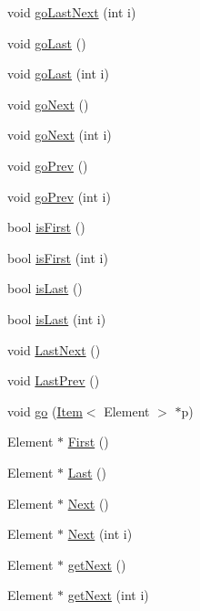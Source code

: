 \begin{CompactItemize}
void \hyperlink{classCollection_c8d2b742e6ccaf94d0e2511840a1783c}{goLastNext} (int i)
\item 
void \hyperlink{classCollection_24f595ff9a3daddd71e9625e12086b8d}{goLast} ()
\item 
void \hyperlink{classCollection_6729c15aabfe51403936a00551bcbaf7}{goLast} (int i)
\item 
void \hyperlink{classCollection_71ab918a6e6938f9e8bf1ce9ac36c25a}{goNext} ()
\item 
void \hyperlink{classCollection_8fe6a6dbc35949197de73013bb67fa07}{goNext} (int i)
\item 
void \hyperlink{classCollection_ba0170475fe3ff507bbcd8dc48a8f658}{goPrev} ()
\item 
void \hyperlink{classCollection_c3d18037a745f47a28b2ea652fdc564f}{goPrev} (int i)
\item 
bool \hyperlink{classCollection_3c644d87c5fe1109b3110c9bce5f55be}{isFirst} ()
\item 
bool \hyperlink{classCollection_2b74d7145a6497de50e7577a9e9bd8a0}{isFirst} (int i)
\item 
bool \hyperlink{classCollection_d78260d61be71fe6a0f8ccc949e64c97}{isLast} ()
\item 
bool \hyperlink{classCollection_d38ade90824908e6ad66ed29e48a617d}{isLast} (int i)
\item 
void \hyperlink{classCollection_8df9a591b311c789a49b9e7ebc8982b5}{LastNext} ()
\item 
void \hyperlink{classCollection_c72a422277e0f0b0964de5bf098ccfcb}{LastPrev} ()
\item 
void \hyperlink{classCollection_9e206e3c49e72d153b52eaa808d6f5c0}{go} (\hyperlink{structItem}{Item}$<$ Element $>$ $\ast$p)
\item 
Element $\ast$ \hyperlink{classCollection_40aead667bc00ad6a89d58c76add2f1f}{First} ()
\item 
Element $\ast$ \hyperlink{classCollection_4db73392b0ef7120c311226e3061eeb5}{Last} ()
\item 
Element $\ast$ \hyperlink{classCollection_8ffdd965b1d80ce385691cc1baffbfac}{Next} ()
\item 
Element $\ast$ \hyperlink{classCollection_83ab50404b4cab96cca07e314a93d829}{Next} (int i)
\item 
Element $\ast$ \hyperlink{classCollection_b26674c8b7ed8867faafa6d6456fffd6}{getNext} ()
\item 
Element $\ast$ \hyperlink{classCollection_d26b55661b223de57ce88c2d6a190961}{getNext} (int i)
\item 

\end{CompactItemize}
